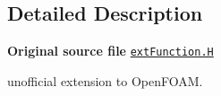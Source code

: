 \subsection{Detailed Description}
{\bfseries Original source file} \href{../../../home/carlo/data/GeN-Foam/GeN-Foam_ffn/GeN-Foam/GeN-Foam/FMU4FOAM/ECI4FOAM/src/externalComm/externalIO/output/extFunction/extFunction.H}{\tt ext\+Function.\+H}

\begin{DoxyVerb}unofficial extension to OpenFOAM.\end{DoxyVerb}
